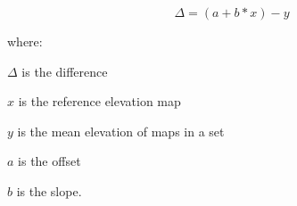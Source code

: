 \documentclass[prodmode,acmtochi]{acmsmall} %
\begin{document}
\begin{equation}
\label{eq:regressed_difference}
\Delta = (a + b * x) - y
\end{equation}

where:

\hspace*{1em} $\Delta$ is the difference %

\hspace*{1em} $x$ is the reference elevation map %

\hspace*{1em} $y$ is the mean elevation of maps in a set %

\hspace*{1em} $a$ is the offset

\hspace*{1em} $b$ is the slope.\\








%
%
%
%
%
%
%
%
%
%
%
%
%
%
%
%
%
%
%
%
\end{document}
